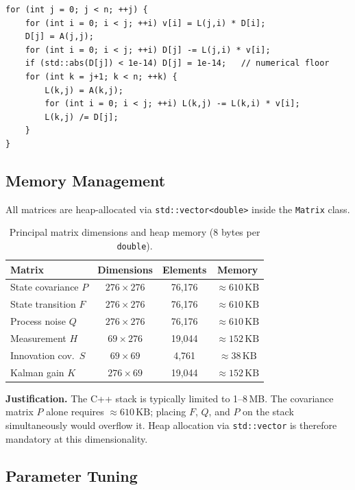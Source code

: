 \documentclass[11pt, a4paper]{article}
\begin{document}
\begin{lstlisting}[caption={LDL$^\top$ core loop in \texttt{lkf.cpp}}]
for (int j = 0; j < n; ++j) {
    for (int i = 0; i < j; ++i) v[i] = L(j,i) * D[i];
    D[j] = A(j,j);
    for (int i = 0; i < j; ++i) D[j] -= L(j,i) * v[i];
    if (std::abs(D[j]) < 1e-14) D[j] = 1e-14;   // numerical floor
    for (int k = j+1; k < n; ++k) {
        L(k,j) = A(k,j);
        for (int i = 0; i < j; ++i) L(k,j) -= L(k,i) * v[i];
        L(k,j) /= D[j];
    }
}
\end{lstlisting}

\subsection{Memory Management}

All matrices are heap-allocated via \texttt{std::vector<double>} inside the
\texttt{Matrix} class.

\begin{table}[H]
\centering
\caption{Principal matrix dimensions and heap memory (8 bytes per \texttt{double}).}
\begin{tabular}{lccc}
\toprule
Matrix & Dimensions & Elements & Memory \\
\midrule
State covariance $P$  & $276 \times 276$ & 76{,}176 & $\approx 610\,\text{KB}$ \\
State transition $F$  & $276 \times 276$ & 76{,}176 & $\approx 610\,\text{KB}$ \\
Process noise $Q$     & $276 \times 276$ & 76{,}176 & $\approx 610\,\text{KB}$ \\
Measurement $H$       & $69  \times 276$ & 19{,}044 & $\approx 152\,\text{KB}$ \\
Innovation cov.\ $S$  & $69  \times 69$  & 4{,}761  & $\approx  38\,\text{KB}$ \\
Kalman gain $K$       & $276 \times 69$  & 19{,}044 & $\approx 152\,\text{KB}$ \\
\bottomrule
\end{tabular}
\end{table}

\textbf{Justification.} The C++ stack is typically limited to 1--8\,MB.
The covariance matrix $P$ alone requires $\approx610\,\text{KB}$; placing $F$,
$Q$, and $P$ on the stack simultaneously would overflow it.
Heap allocation via \texttt{std::vector} is therefore mandatory at this
dimensionality.

\subsection{Parameter Tuning}
\label{sec:tuning}
\end{document}
